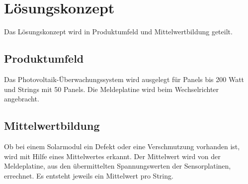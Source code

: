 \section{L\"osungskonzept}
Das Lösungskonzept wird in Produktumfeld und Mittelwertbildung geteilt.
\subsection{Produktumfeld}
Das Photovoltaik-Überwachungssystem wird ausgelegt für Panels bis 200 Watt und Strings mit 50 Panels. Die Meldeplatine wird beim Wechselrichter angebracht.
\subsection{Mittelwertbildung}
Ob bei einem Solarmodul ein Defekt oder eine Verschmutzung vorhanden ist, wird mit Hilfe eines Mittelwertes erkannt. Der Mittelwert wird von der Meldeplatine, aus den übermittelten Spannungswerten der Sensorplatinen, errechnet. Es entsteht jeweils ein Mittelwert pro String.